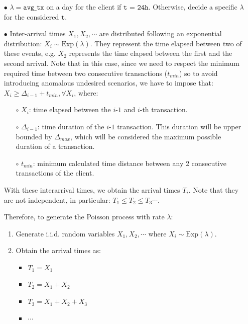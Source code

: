 \documentclass{article}
\begin{document}
\begin{itemize}
    \item[$\bullet$] $\lambda=\texttt{avg\_tx}$ on a day for the client if $\texttt{t = 24h}$. Otherwise, 
    decide a specific $\lambda$ for the considered $\texttt{t}$.
    \item[$\bullet$] Inter-arrival times $X_1, X_2, \cdots$ are distributed following an exponential distribution:
    $X_i \sim \text{Exp}(\lambda)$. They represent the time elapsed between two of these events, e.g. $X_2$ represents the time elapsed between the first and the second arrival. Note that in this case, since we need to respect the minimum required time between two consecutive 
    transactions ($t_{min}$) so to avoid introducing anomalous undesired scenarios, we have to impose
    that: $X_i \geq \Delta_{i-1} + t_{min}, \forall X_i$, where:

    \begin{itemize}
      \item[$\circ$] $X_{i}$: time elapsed between the $i$-$1$ and $i$-th transaction.
      \item[$\circ$] $\Delta_{i-1}$: time duration of the $i$-$1$ transaction. This duration will 
      be upper bounded by $\Delta_{max}$, which will be considered the maximum possible duration of a transaction.
      \item[$\circ$] $t_{min}$: minimum calculated time distance between any 2 consecutive transactions of the client.
  \end{itemize}

    With these interarrival times, we obtain the arrival times $T_i$. Note that they are not independent, in particular:
    $T_1 \leq T_2 \leq T_3 \cdots$.

    Therefore, to generate the Poisson process with rate $\lambda$:
    \begin{enumerate}
      \item Generate i.i.d. random variables $X_1, X_2, \cdots$ where $X_i \sim \text{Exp}(\lambda)$.
      \item Obtain the arrival times as:
        \begin{itemize}
          \item $T_1 = X_1$
          \item $T_2 = X_1 + X_2$
          \item $T_3 = X_1 + X_2 + X_3$
          \item $\cdots$
        \end{itemize}
    \end{enumerate}


\end{itemize}
\end{document}
